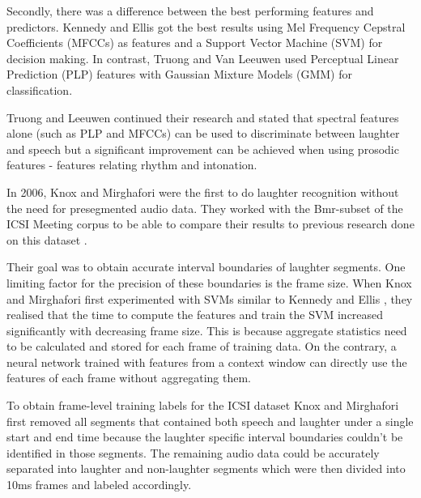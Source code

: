 \documentclass[bsc,frontabs,parskip,deptreport]{infthesis}
\begin{document}
Secondly, there was a difference between the best performing features and predictors.  
Kennedy and Ellis \citep{kennedy2004laughter} got the best results using Mel Frequency Cepstral Coefficients (MFCCs) as features and a Support Vector Machine (SVM) for decision making. 
In contrast, Truong and Van Leeuwen \citep{truong2005automatic} used Perceptual Linear Prediction (PLP) features with Gaussian Mixture Models (GMM) for classification. 

Truong and Leeuwen \citep{truong2007automatic} continued their research and stated that spectral features alone (such as PLP and MFCCs) can be used to discriminate between laughter and speech but a significant improvement can be achieved when using prosodic features - features relating rhythm and intonation.

In 2006, Knox and Mirghafori \citep{knox2006automatic} were the first to do laughter recognition without the need for presegmented audio data.  
They worked with the Bmr-subset of the ICSI Meeting corpus \citep{morgan2001meeting} to be able to compare their results to previous research done on this dataset \citep{kennedy2004laughter, truong2005automatic, truong2007automatic}.

Their goal was to obtain accurate interval boundaries of laughter segments.
One limiting factor for the precision of these boundaries is the frame size. 
When Knox and Mirghafori first experimented with SVMs similar to Kennedy and Ellis \citep{kennedy2004laughter}, they realised that the time to compute the features and train the SVM increased significantly with decreasing frame size. 
This is because aggregate statistics need to be calculated and stored for each frame of training data.  
On the contrary, a neural network trained with features from a context window can directly use the features of each frame without aggregating them.  

To obtain frame-level training labels for the ICSI dataset Knox and Mirghafori first removed all segments that contained both speech and laughter under a single start and end time because the laughter specific interval boundaries couldn't be identified in those segments. 
The remaining audio data could be accurately separated into laughter and non-laughter segments which were then divided into 10ms frames and labeled accordingly.
\end{document}
